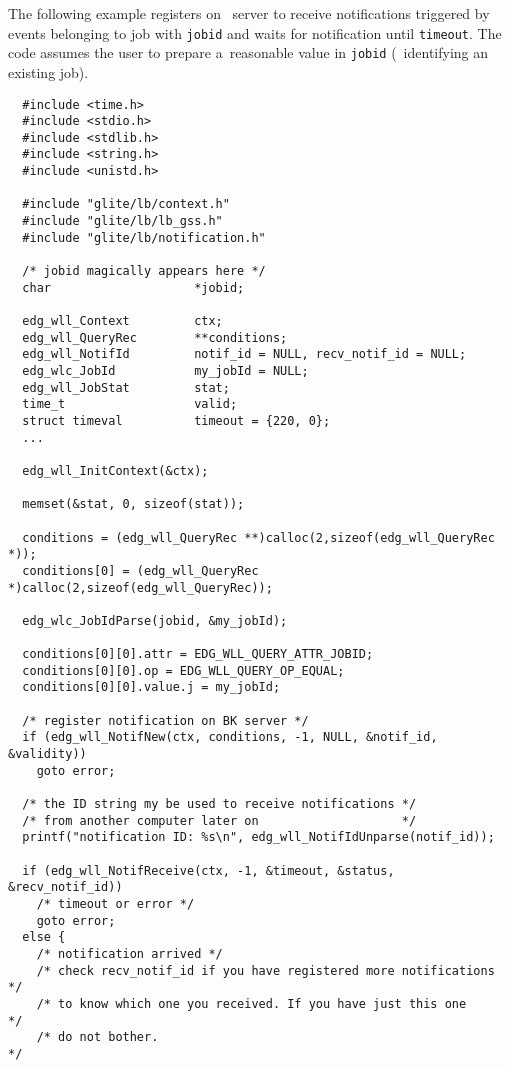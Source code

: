 The following example registers on \LB\ server to receive notifications triggered by events belonging to job with \verb'jobid' and waits for notification until \verb'timeout'.
The code assumes the user to prepare a~reasonable value in \verb'jobid'
(\ie\ identifying an existing job).


\begin{verbatim}
  #include <time.h>
  #include <stdio.h>
  #include <stdlib.h>
  #include <string.h>
  #include <unistd.h>

  #include "glite/lb/context.h"
  #include "glite/lb/lb_gss.h"
  #include "glite/lb/notification.h"

  /* jobid magically appears here */
  char                    *jobid;

  edg_wll_Context         ctx;
  edg_wll_QueryRec        **conditions;
  edg_wll_NotifId         notif_id = NULL, recv_notif_id = NULL;
  edg_wlc_JobId           my_jobId = NULL;
  edg_wll_JobStat         stat;
  time_t                  valid;
  struct timeval          timeout = {220, 0};
  ...

  edg_wll_InitContext(&ctx);

  memset(&stat, 0, sizeof(stat));

  conditions = (edg_wll_QueryRec **)calloc(2,sizeof(edg_wll_QueryRec *));
  conditions[0] = (edg_wll_QueryRec *)calloc(2,sizeof(edg_wll_QueryRec));

  edg_wlc_JobIdParse(jobid, &my_jobId);

  conditions[0][0].attr = EDG_WLL_QUERY_ATTR_JOBID;
  conditions[0][0].op = EDG_WLL_QUERY_OP_EQUAL;
  conditions[0][0].value.j = my_jobId;

  /* register notification on BK server */
  if (edg_wll_NotifNew(ctx, conditions, -1, NULL, &notif_id, &validity))
    goto error;

  /* the ID string my be used to receive notifications */
  /* from another computer later on                    */
  printf("notification ID: %s\n", edg_wll_NotifIdUnparse(notif_id));

  if (edg_wll_NotifReceive(ctx, -1, &timeout, &status, &recv_notif_id))
    /* timeout or error */
    goto error;
  else {
    /* notification arrived */
    /* check recv_notif_id if you have registered more notifications */
    /* to know which one you received. If you have just this one     */
    /* do not bother.                                                */


\end{verbatim}
